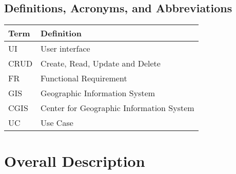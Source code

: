\documentclass{article}
\begin{document}
        \subsection{Definitions, Acronyms, and Abbreviations}
            \begin{table}[ht!]
	\centering
	\begin{tabular}{|p{4cm}|p{7cm}|}
		\hline
		\textbf{Term} & \textbf{Definition} \\		
		\hline
		UI & User interface \\
        \hline
		CRUD & Create, Read, Update and Delete \\
		\hline
		FR & Functional Requirement \\
		\hline
		GIS & Geographic Information System \\
		\hline
		CGIS & Center for Geographic Information System \\
		\hline
		UC & Use Case\\
		\hline
	\end{tabular}
\end{table}
       
	\section{Overall Description}
        
\end{document}
